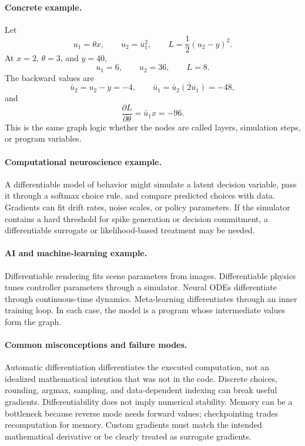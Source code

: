 \paragraph{Concrete example.}
Let
\[
u_1=\theta x,\qquad u_2=u_1^2,\qquad L=\frac12(u_2-y)^2.
\]
At \(x=2\), \(\theta=3\), and \(y=40\),
\[
u_1=6,\qquad u_2=36,\qquad L=8.
\]
The backward values are
\[
\bar u_2=u_2-y=-4,
\qquad
\bar u_1=\bar u_2(2u_1)=-48,
\]
and
\[
\frac{\partial L}{\partial \theta}=\bar u_1 x=-96.
\]
This is the same graph logic whether the nodes are called layers, simulation steps, or program variables.

\paragraph{Computational neuroscience example.}
A differentiable model of behavior might simulate a latent decision variable, pass it through a softmax choice rule, and compare predicted choices with data. Gradients can fit drift rates, noise scales, or policy parameters. If the simulator contains a hard threshold for spike generation or decision commitment, a differentiable surrogate or likelihood-based treatment may be needed.

\paragraph{AI and machine-learning example.}
Differentiable rendering fits scene parameters from images. Differentiable physics tunes controller parameters through a simulator. Neural ODEs differentiate through continuous-time dynamics. Meta-learning differentiates through an inner training loop. In each case, the model is a program whose intermediate values form the graph.

\paragraph{Common misconceptions and failure modes.}
Automatic differentiation differentiates the executed computation, not an idealized mathematical intention that was not in the code. Discrete choices, rounding, argmax, sampling, and data-dependent indexing can break useful gradients. Differentiability does not imply numerical stability. Memory can be a bottleneck because reverse mode needs forward values; checkpointing trades recomputation for memory. Custom gradients must match the intended mathematical derivative or be clearly treated as surrogate gradients.

